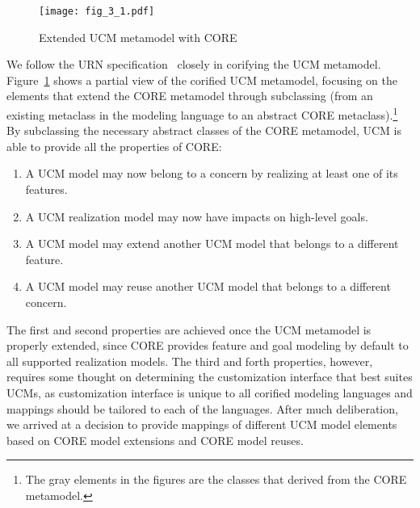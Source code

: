 \begin{figure}
	\centering
	\texttt{[image: fig\_3\_1.pdf]}
	\caption{Extended UCM metamodel with CORE}
	\label{fig:3.1}
\end{figure}

We follow the URN specification~\cite{itu2012151} closely in corifying the UCM metamodel. Figure~\ref{fig:3.1} shows a partial view of the corified UCM metamodel, focusing on the elements that extend the CORE metamodel through subclassing (from an existing metaclass in the modeling language to an abstract CORE metaclass).\footnote{The gray elements in the figures are the classes that derived from the CORE metamodel.} By subclassing the necessary abstract classes of the CORE metamodel, UCM is able to provide all the properties of CORE:

\begin{enumerate}[noitemsep]
	\item A UCM model may now belong to a concern by realizing at least one of its features.
	\item A UCM realization model may now have impacts on high-level goals.
	\item A UCM model may extend another UCM model that belongs to a different feature.
	\item A UCM model may reuse another UCM model that belongs to a different concern.
\end{enumerate}

The first and second properties are achieved once the UCM metamodel is properly extended, since CORE provides feature and goal modeling by default to all supported realization models. The third and forth properties, however, requires some thought on determining the customization interface that best suites UCMs, as customization interface is unique to all corified modeling languages and mappings should be tailored to each of the languages. After much deliberation, we arrived at a decision to provide mappings of different UCM model elements based on CORE model extensions and CORE model reuses.


